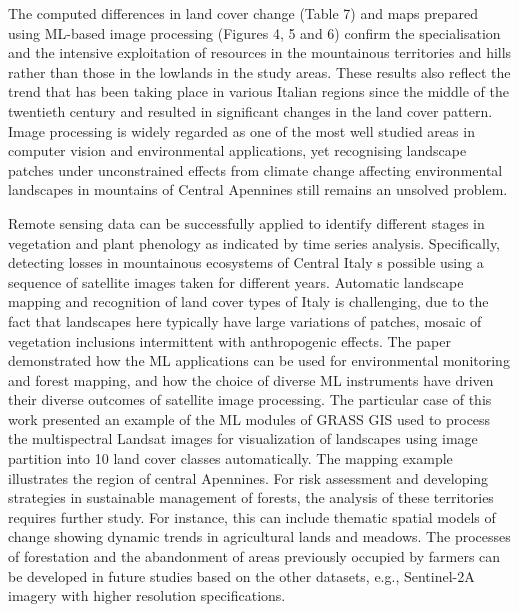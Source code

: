 \documentclass[remotesensing,article,submit,pdftex,moreauthors]{Definitions/mdpi}
\begin{document}
The computed differences in land cover change (Table 7) and maps prepared using ML-based image processing (Figures 4, 5 and 6) confirm the specialisation and the intensive exploitation of resources in the mountainous territories and hills rather than those in the lowlands in the study areas. These results also reflect the trend that has been taking place in various Italian regions since the middle of the twentieth century and resulted in significant changes in the land cover pattern. Image processing is widely regarded as one of the most well studied areas in computer vision and environmental applications, yet recognising landscape patches under unconstrained effects from climate change affecting environmental landscapes in mountains of Central Apennines still remains an unsolved problem. 

Remote sensing data can be successfully applied to identify different stages in vegetation and plant phenology as indicated by time series analysis. Specifically, detecting losses in mountainous ecosystems of Central Italy s possible using a sequence of satellite images taken for different years. Automatic landscape mapping and recognition of land cover types of Italy is challenging, due to the fact that landscapes here typically have large variations of patches, mosaic of vegetation inclusions intermittent with anthropogenic effects. The paper demonstrated how the ML applications can be used for environmental monitoring and forest mapping, and how the choice of diverse ML instruments have driven their diverse outcomes of satellite image processing. The particular case of this work presented an example of the ML modules of GRASS GIS used to process the multispectral Landsat images for visualization of landscapes using image partition into 10 land cover classes automatically. The mapping example illustrates the region of central Apennines. For risk assessment and developing strategies in sustainable management of forests, the analysis of these territories requires further study. For instance, this can include thematic spatial models of change showing dynamic trends in agricultural lands and meadows. The processes of forestation and the abandonment of areas previously occupied by farmers can be developed in future studies based on the other datasets, e.g., Sentinel-2A imagery with higher resolution specifications.
\end{document}
